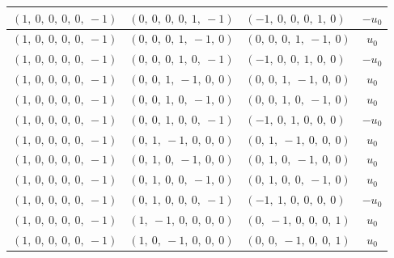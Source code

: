 \documentclass[11pt]{article}
\theoremstyle{definition}
\begin{document}
\begin{longtable}{|l|l|l|c|}
    \hline
    $\left( 1, \  0, \  0, \  0, \  0, \  -1\right)$ & $\left( 0, \  0, \  0, \  0, \  1, \  -1\right)$ & $\left( -1, \  0, \  0, \  0, \  1, \  0\right)$ & $- u_{0}$ \\
    \hline
    $\left( 1, \  0, \  0, \  0, \  0, \  -1\right)$ & $\left( 0, \  0, \  0, \  1, \  -1, \  0\right)$ & $\left( 0, \  0, \  0, \  1, \  -1, \  0\right)$ & $u_{0}$ \\
    \hline
    $\left( 1, \  0, \  0, \  0, \  0, \  -1\right)$ & $\left( 0, \  0, \  0, \  1, \  0, \  -1\right)$ & $\left( -1, \  0, \  0, \  1, \  0, \  0\right)$ & $- u_{0}$ \\
    \hline
    $\left( 1, \  0, \  0, \  0, \  0, \  -1\right)$ & $\left( 0, \  0, \  1, \  -1, \  0, \  0\right)$ & $\left( 0, \  0, \  1, \  -1, \  0, \  0\right)$ & $u_{0}$ \\
    \hline
    $\left( 1, \  0, \  0, \  0, \  0, \  -1\right)$ & $\left( 0, \  0, \  1, \  0, \  -1, \  0\right)$ & $\left( 0, \  0, \  1, \  0, \  -1, \  0\right)$ & $u_{0}$ \\
    \hline
    $\left( 1, \  0, \  0, \  0, \  0, \  -1\right)$ & $\left( 0, \  0, \  1, \  0, \  0, \  -1\right)$ & $\left( -1, \  0, \  1, \  0, \  0, \  0\right)$ & $- u_{0}$ \\
    \hline
    $\left( 1, \  0, \  0, \  0, \  0, \  -1\right)$ & $\left( 0, \  1, \  -1, \  0, \  0, \  0\right)$ & $\left( 0, \  1, \  -1, \  0, \  0, \  0\right)$ & $u_{0}$ \\
    \hline
    $\left( 1, \  0, \  0, \  0, \  0, \  -1\right)$ & $\left( 0, \  1, \  0, \  -1, \  0, \  0\right)$ & $\left( 0, \  1, \  0, \  -1, \  0, \  0\right)$ & $u_{0}$ \\
    \hline
    $\left( 1, \  0, \  0, \  0, \  0, \  -1\right)$ & $\left( 0, \  1, \  0, \  0, \  -1, \  0\right)$ & $\left( 0, \  1, \  0, \  0, \  -1, \  0\right)$ & $u_{0}$ \\
    \hline
    $\left( 1, \  0, \  0, \  0, \  0, \  -1\right)$ & $\left( 0, \  1, \  0, \  0, \  0, \  -1\right)$ & $\left( -1, \  1, \  0, \  0, \  0, \  0\right)$ & $- u_{0}$ \\
    \hline
    $\left( 1, \  0, \  0, \  0, \  0, \  -1\right)$ & $\left( 1, \  -1, \  0, \  0, \  0, \  0\right)$ & $\left( 0, \  -1, \  0, \  0, \  0, \  1\right)$ & $u_{0}$ \\
    \hline
    $\left( 1, \  0, \  0, \  0, \  0, \  -1\right)$ & $\left( 1, \  0, \  -1, \  0, \  0, \  0\right)$ & $\left( 0, \  0, \  -1, \  0, \  0, \  1\right)$ & $u_{0}$ \\

\end{longtable}
\end{document}
